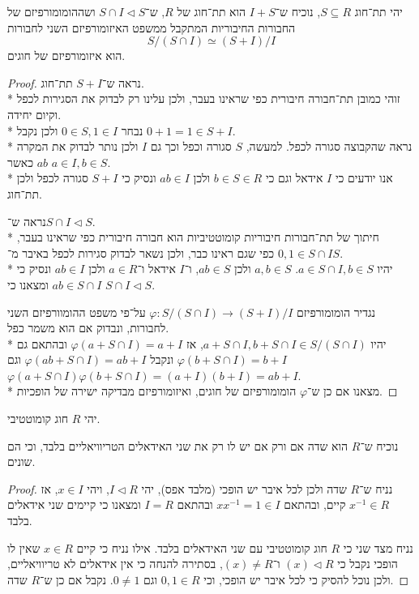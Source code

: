 \Subquestion{}
יהי תת־חוג $S \subseteq R$, נוכיח ש־$I + S$ הוא תת־חוג של $R$, ש־$S \cap I \triangleleft S$ ושההומומורפיזם של החבורות החיבוריות המתקבל ממשפט האיזומורפיזם השני לחבורות
\[
	S / (S \cap I) \simeq (S + I) / I
\]
הוא איזומורפיזם של חוגים.
\begin{proof}
	נראה ש־$S + I$ תת־חוג. \\*
	זוהי כמובן תת־חבורה חיבורית כפי שראינו בעבר, ולכן עלינו רק לבדוק את הסגירות לכפל וקיום יחידה. \\*
	נבחר $0 \in S, 1 \in I$ ולכן נקבל $0 + 1 = 1 \in S + I$. \\*
	נראה שהקבוצה סגורה לכפל. למעשה, $S$ סגורה וכפל וכך גם $I$ ולכן נותר לבדוק את המקרה $ab$ כאשר $a \in I, b \in S$. \\*
	אנו יודעים כי $I$ אידאל וגם כי $b \in S \in R$ ולכן $ab \in I$ ונסיק כי $S + I$ סגורה לכפל ולכן תת־חוג.

	נראה ש־$S \cap I \triangleleft S$. \\*
	חיתוך של תת־חבורות חיבוריות קומוטטיביות הוא חבורה חיבורית כפי שראינו בעבר, $0, 1 \in S \cap I$ כפי שגם ראינו כבר, ולכן נשאר לבדוק סגירות לכפל באיבר מ־$S$. \\*
	יהיו $a \in S \cap I, b \in S$. $a, b \in S$ ולכן $ab \in S$, ו־$I$ אידאל ו־$a \in R$ ולכן $ab \in I$ ונסיק כי $ab \in S \cap I$ ומצאנו כי $S \cap I \triangleleft S$.

	נגדיר הומומורפיזם $\varphi : S / (S \cap I) \to (S + I) / I$ על־פי משפט ההומוורפיזם השני לחבורות, ונבדוק אם הוא משמר כפל. \\*
	יהיו $a + S \cap I, b + S \cap I \in S / (S \cap I)$,
	אז $\varphi(a + S \cap I) = a + I$ ובהתאם גם $\varphi(b + S \cap I) = b + I$ ונקבל $\varphi(ab + S \cap I) = ab + I$ וגם $\varphi(a + S \cap I)\varphi(b + S \cap I) = (a + I)(b + I) = ab + I$. \\*
	מצאנו אם כן ש־$\varphi$ הומומורפיזם של חוגים, ואיזומורפיזם מבדיקה ישירה של הופכיות.
\end{proof}

\Question{}
יהי $R$ חוג קומוטטיבי.

\Subquestion{}
נוכיח ש־$R$ הוא שדה אם ורק אם יש לו רק את שני האידאלים הטריוויאליים בלבד, וכי הם שונים.
\begin{proof}
	נניח ש־$R$ שדה ולכן לכל איבר יש הופכי (מלבד אפס), יהי $I \triangleleft R$, ויהי $x \in I$, אז $x^{-1} \in R$ קיים, ובהתאם $x x^{-1} = 1 \in I$ ובהתאם $I = R$ ומצאנו כי קיימים שני אידאלים בלבד.

	נניח מצד שני כי $R$ חוג קומוטטיבי עם שני האידאלים בלבד.
	אילו נניח כי קיים $x \in R$ שאין לו הופכי נקבל כי $(x) \triangleleft R$ ו־$(x) \ne R$, בסתירה להנחה כי אין אידאלים לא טריוויאליים, ולכן נוכל להסיק כי לכל איבר יש הופכי, וכי $0, 1 \in R$ וגם $0 \ne 1$.
	נקבל אם כן ש־$R$ שדה.
\end{proof}

